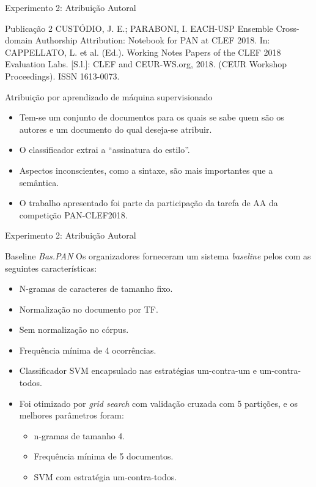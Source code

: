 \begin{frame}{Experimento 2: Atribuição Autoral}
\begin{block}{Publicação 2}
CUSTÓDIO, J. E.; PARABONI, I. EACH-USP Ensemble Cross-domain Authorship
Attribution: Notebook for PAN at CLEF 2018. In: CAPPELLATO, L. et al. (Ed.).
Working Notes Papers of the CLEF 2018 Evaluation Labs. [S.l.]: CLEF and CEUR-WS.org,
2018. (CEUR Workshop Proceedings). ISSN 1613-0073.
\end{block}

\begin{block}{Atribuição por aprendizado de máquina supervisionado}
\begin{itemize}
\item Tem-se um conjunto de documentos para os quais se sabe quem são os autores e um documento do qual deseja-se atribuir.
\item O classificador extrai a ``assinatura do estilo''.
\item Aspectos inconscientes, como a sintaxe, são mais importantes que a semântica.
\item O trabalho apresentado foi parte da participação da tarefa de AA da competição PAN-CLEF2018.
\end{itemize}
\end{block}
\end{frame}

\begin{frame}{Experimento 2: Atribuição Autoral}
\begin{block}{Baseline {\it Bas.PAN}}
Os organizadores forneceram um sistema {\it baseline} pelos com as seguintes características:
\begin{itemize}
\item N-gramas de caracteres de tamanho fixo.
\item Normalização no documento por TF.
\item Sem normalização no córpus.
\item Frequência mínima de 4 ocorrências.
\item Classificador SVM encapsulado nas estratégias um-contra-um e um-contra-todos.
\item Foi otimizado por {\it grid search} com validação cruzada com 5 partições, e os melhores parâmetros foram:
\begin{itemize}\selectFont
\item n-gramas de tamanho 4.
\item Frequência mínima de 5 documentos.
\item SVM com estratégia um-contra-todos.
\end{itemize}
\end{itemize}
\end{block}
\end{frame}

